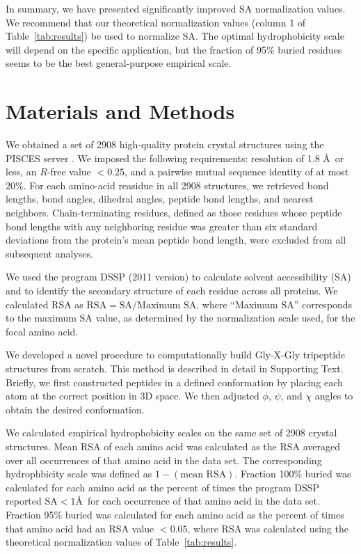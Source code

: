 \documentclass[11pt]{article}
\begin{document}
In summary, we have presented significantly improved SA normalization values. We recommend that our theoretical normalization values (column 1 of Table~\ref{tab:results}) be used to normalize SA. The optimal hydrophobicity scale will depend on the specific application, but the fraction of 95\% buried residues seems to be the best general-purpose empirical scale.


\section*{Materials and Methods}

We obtained a set of 2908 high-quality protein crystal structures using the PISCES server \cite{WangDunbrack2003}. We imposed the following requirements: resolution of 1.8 \AA\ or less, an $R$-free value $<0.25$, and a pairwise mutual sequence identity of at most 20\%. For each amino-acid reasidue in all 2908 structures, we retrieved bond lengths, bond angles, dihedral angles, peptide bond lengths, and nearest neighbors. Chain-terminating residues, defined as those residues whose peptide bond lengths with any neighboring residue was greater than six standard deviations from the protein's mean peptide bond length, were excluded from all subsequent analyses.

We used the program DSSP (2011 version) \cite{Kabsch1983} to calculate solvent accessibility (SA) and to identify the secondary structure of each residue across all proteins. We calculated RSA as $\text{RSA}=\text{SA}/\text{Maximum SA}$, where ``Maximum SA'' corresponds to the maximum SA value, as determined by the normalization scale used, for the focal amino acid. 

We developed a novel procedure to computationally build Gly-X-Gly tripeptide structures from scratch. This method is described in detail in Supporting Text. Briefly, we first constructed peptides in a defined conformation by placing each atom at the correct position in 3D space. We then adjusted $\phi$, $\psi$, and $\chi$ angles to obtain the desired conformation. 

We calculated empirical hydrophobicity scales on the same set of 2908 crystal structures. Mean RSA of each amino acid was calculated as the RSA averaged over all occurrences of that amino acid in the data set. The corresponding hydrophbicity scale was defined as $1-(\text{mean RSA})$. Fraction 100\% buried was calculated for each amino acid as the percent of times the program DSSP reported $\text{SA}<1$\AA\ for each occurrence of that amino acid in the data set. Fraction 95\% buried was calculated for each amino acid as the percent of times that amino acid had an RSA value $<0.05$, where RSA was calculated using the theoretical normalization values of Table~\ref{tab:results}.
\end{document}

